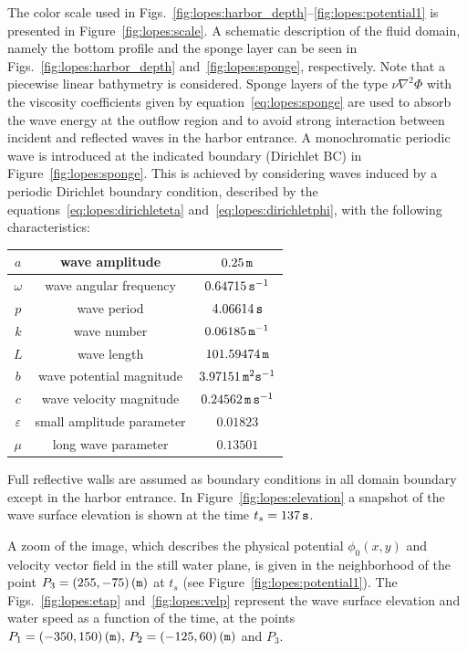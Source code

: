The color scale used in
Figs.~\ref{fig:lopes:harbor_depth}--\ref{fig:lopes:potential1} is
presented in Figure~\ref{fig:lopes:scale}.  A schematic description of
the fluid domain, namely the bottom profile and the sponge layer can
be seen in Figs.~\ref{fig:lopes:harbor_depth}
and~\ref{fig:lopes:sponge}, respectively.  Note that a piecewise
linear bathymetry is considered.  Sponge layers of the type
$\nu\nabla^2\Phi$ with the viscosity coefficients given by
equation~\eqref{eq:lopes:sponge} are used to absorb the wave energy at
the outflow region and to avoid strong interaction between incident
and reflected waves in the harbor entrance.  A monochromatic periodic
wave is introduced at the indicated boundary (Dirichlet BC) in
Figure~\ref{fig:lopes:sponge}.  This is achieved by considering waves
induced by a periodic Dirichlet boundary condition, described by the
equations~\eqref{eq:lopes:dirichleteta}
and~\eqref{eq:lopes:dirichletphi}, with the following characteristics:
\smallskip
\begin{center}
  \renewcommand{\arraystretch}{1.3}
  \begin{tabular}{ccc}
    \toprule
    $a$ & wave amplitude & $0.25 \,{\tt m}$\\
    \midrule
    $\omega$ & wave angular frequency & $0.64715 \,{\tt
      s}^{-1}$\\ $p$ & wave period & $4.06614 \,{\tt
      s}$\\ $k$ & wave number & $0.06185 \,{\tt
      m}^{-1}$\\ $L$ & wave length & $101.59474 \,{\tt
      m}$\\ $b$ & wave potential magnitude& $3.97151
    \,{\tt m}^2{\tt s}^{-1}$\\ $c$ & wave velocity
    magnitude& $0.24562 \,{\tt m\, s}^{-1}$ \\
    $\varepsilon$& small amplitude parameter &
    $0.01823$\\ $\mu$ & long wave parameter &
    $0.13501$\\
    \bottomrule
  \end{tabular}
\end{center}
\smallskip
Full reflective walls are assumed as boundary conditions in all domain
boundary except in the harbor entrance.  In
Figure~\ref{fig:lopes:elevation} a snapshot of the wave surface
elevation is shown at the time $t_s=137\,{\tt s}$.

 A zoom of the image, which describes the physical potential
$\phi_0(x,y)$ and velocity vector field in the still water plane, is
given in the neighborhood of the point $P_3=(255,-75)\,({\tt m})$ at
$t_s$ (see Figure~\ref{fig:lopes:potential1}).  The
Figs.~\ref{fig:lopes:etap} and~\ref{fig:lopes:velp} represent the wave
surface elevation and water speed as a function of the time, at the
points $P_1=(-350, 150)\,({\tt m}),\, P_2=(-125,60)\,({\tt m})$ and
$P_3$.

